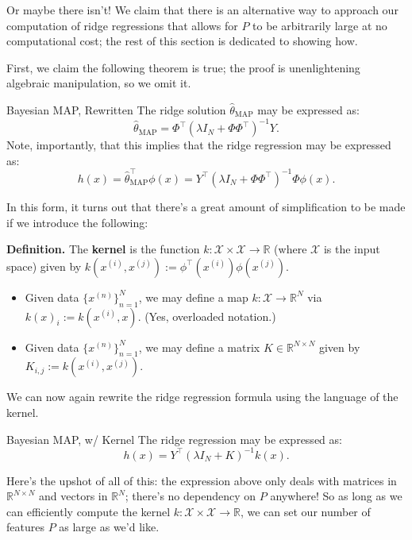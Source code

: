 Or maybe there isn't!  We claim that there is an alternative way
to approach our computation of ridge regressions
that allows for $P$ to be arbitrarily large
at no computational cost;
the rest of this section
is dedicated to showing how.

First, we claim the following theorem is true;
the proof is unenlightening algebraic manipulation, so we omit it.

\begin{theorem}{Bayesian MAP, Rewritten}
    The ridge solution $\hat{\theta}_{\mathrm{MAP}}$ may be expressed as:
    \[ \hat{\theta}_{\mathrm{MAP}}
    = \Phi^{\top}\left(
        \lambda I_N + \Phi\Phi^{\top}
    \right)^{-1}Y. \]
    Note, importantly, that this implies that the
    ridge regression may be expressed as:
    \[ h(x) = \hat{\theta}^{\top}_{\mathrm{MAP}} \phi(x)
    = Y^{\top}\left(
        \lambda I_N + \Phi\Phi^{\top}
    \right)^{-1} \Phi \phi(x). \]
\end{theorem}

In this form, it turns out that there's
a great amount of simplification to be made
if we introduce the following:

\textbf{Definition.}
The \textbf{kernel} is the function
$k \colon \mathcal{X} \times \mathcal{X} \to \mathbb{R}$ (where $\mathcal{X}$
is the input space) given by
$k(x^{(i)}, x^{(j)}) := \phi^{\top}(x^{(i)}) \phi(x^{(j)})$.
\begin{itemize}
    \item Given data $\{x^{(n)}\}_{n = 1}^N$,
    we may define a map $k: \mathcal{X} \to \mathbb{R}^N$
    via $k(x)_i := k(x^{(i)}, x)$.
    (Yes, overloaded notation.)
    \item Given data $\{x^{(n)}\}_{n = 1}^N$,
    we may define a matrix $K \in \mathbb{R}^{N \times N}$
    given by $K_{i, j} := k(x^{(i)}, x^{(j)})$.
\end{itemize}

We can now again rewrite the ridge regression formula
using the language of the kernel.

\begin{theorem}{Bayesian MAP, w/ Kernel}
    The ridge regression may be expressed as:
    \[ h(x) = Y^{\top}\left(\lambda I_N + K\right)^{-1} k(x). \]
\end{theorem}

Here's the upshot of all of this:
the expression above only deals with
matrices in $\mathbb{R}^{N \times N}$
and vectors in $\mathbb{R}^{N}$;
there's no dependency on $P$ anywhere!
So as long as we can efficiently compute
the kernel $k \colon \mathcal{X} \times \mathcal{X} \to \mathbb{R}$,
we can set our number of features $P$ as large as we'd like.

